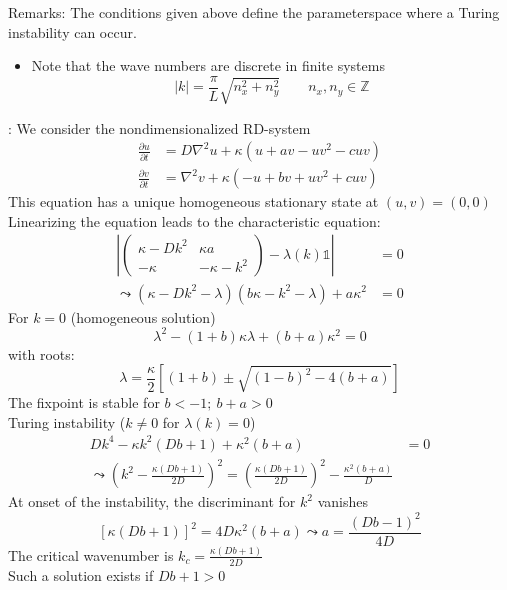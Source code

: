 Remarks: The conditions given above define the parameterspace where a Turing instability can occur.
\begin{itemize}[label={$\cdot$}]
	\item Note that the wave numbers are discrete in finite systems
		\begin{equation*}
			|k|=\frac{\pi}{L}\sqrt{n_x^2+n_y^2}\qquad n_x,n_y\in\mathbb{Z}
		\end{equation*}
\end{itemize}
\textbf{\underline{}}: We consider the nondimensionalized RD-system
\begin{align*}
	\frac{\partial u}{\partial t}&=D\nabla^2u+\kappa(u+av-uv^2-cuv)\\
	\frac{\partial v}{\partial t}&=\nabla^2 v+ \kappa(-u+bv+uv^2+cuv)
\end{align*}
This equation has a unique homogeneous stationary state at $(u,v)=(0,0)$\\
Linearizing the equation leads to the characteristic equation:
\begin{align*}
	\left|\begin{pmatrix} \kappa-Dk^2 & \kappa a \\ -\kappa & -\kappa-k^2\end{pmatrix}-\lambda(k)\mathds{1}\right|&=0\\
	\leadsto (\kappa - Dk^2-\lambda)(b\kappa -k^2 -\lambda)+a\kappa^2&=0
\end{align*}
For $k=0$ (homogeneous solution)
\begin{equation*}
	\lambda^2 -(1+b)\kappa\lambda +(b+a)\kappa^2=0
\end{equation*}
with roots:
\begin{equation*}
	\lambda=\frac{\kappa}{2}\left[(1+b)\pm\sqrt{(1-b)^2-4(b+a)}\right]
\end{equation*}
The fixpoint is stable for $b<-1; \ b+a>0$\\
Turing instability ($k\neq 0$ for $\lambda(k)=0$)
\begin{align*}
	Dk^4-\kappa k^2(Db+1) +\kappa^2(b+a)&=0\\
	\leadsto \left(k^2-\frac{\kappa (Db+1)}{2D}\right)^2=\left(\frac{\kappa (Db+1)}{2D}\right)^2-\frac{\kappa^2 (b+a)}{D}
\end{align*}
At onset of the instability, the discriminant for $k^2$ vanishes
\begin{equation*}
	\left[\kappa (Db+1)\right]^2=4D\kappa^2(b+a) \leadsto a=\frac{(Db-1)^2}{4D}
\end{equation*}
The critical wavenumber is $k_c=\frac{\kappa(Db+1)}{2D}$\\
Such a solution exists if $Db+1>0$

